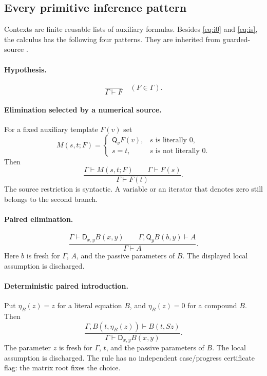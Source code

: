 \documentclass[11pt,letterpaper]{article}
\theoremstyle{definition}
\theoremstyle{remark}
\newcommand{\D}{\mathsf D}
\newcommand{\Q}{\mathsf Q}
\begin{document}
\subsection{Every primitive inference pattern}

Contexts are finite reusable lists of auxiliary formulas. Besides
\eqref{eq:i0} and \eqref{eq:is}, the calculus has the following four
patterns. They are inherited from guarded-source \cite{guardedsource}.

\paragraph{Hypothesis.}
\[
 \frac{}{\Gamma\vdash F}\quad(F\in\Gamma).
 \tag{Hyp}
\]

\paragraph{Elimination selected by a numerical source.}
For a fixed auxiliary template $F(v)$ set
\[
 M(s,t;F)=
 \begin{cases}
   \Q_vF(v),&s\text{ is literally }0,\\
   s=t,&s\text{ is not literally }0.
 \end{cases}
\]
Then
\[
 \frac{\Gamma\vdash M(s,t;F)\qquad\Gamma\vdash F(s)}
      {\Gamma\vdash F(t)}.
 \tag{SE}\label{eq:se}
\]
The source restriction is syntactic. A variable or an iterator that
denotes zero still belongs to the second branch.

\paragraph{Paired elimination.}
\[
 \frac{\Gamma\vdash\D_{x,y}B(x,y)\qquad
       \Gamma,\Q_yB(b,y)\vdash A}
      {\Gamma\vdash A}.
 \tag{DE}\label{eq:de}
\]
Here $b$ is fresh for $\Gamma$, $A$, and the passive parameters of $B$.
The displayed local assumption is discharged.

\paragraph{Deterministic paired introduction.}
Put $\eta_B(z)=z$ for a literal equation $B$, and $\eta_B(z)=0$
for a compound $B$. Then
\[
 \frac{\Gamma,B(t,\eta_B(z))\vdash B(t,Sz)}
      {\Gamma\vdash\D_{x,y}B(x,y)}.
 \tag{DI}\label{eq:di}
\]
The parameter $z$ is fresh for $\Gamma$, $t$, and the passive parameters
of $B$. The local assumption is discharged. The rule has no independent
case/progress certificate flag: the matrix root fixes the choice.
\end{document}
